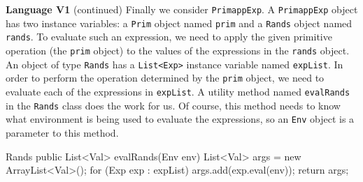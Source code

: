 \begin{minipage}[t]{\sw}
\slidenumber
\LARGE
{\bf Language V1} (continued)\exx
Finally we consider \verb'PrimappExp'.
A \verb'PrimappExp' object has two instance variables:
a \verb'Prim' object named \verb'prim'
and a \verb'Rands' object named \verb'rands'.
To evaluate such an expression,
we need to apply the given primitive operation
(the \verb'prim' object)
to the values of the expressions in the \verb'rands' object.\exx
An object of type \verb'Rands' has
a \verb'List<Exp>' instance variable named \verb'expList'.
In order to perform the operation determined by the \verb'prim' object,
we need to evaluate each of the expressions in \verb'expList'.
A utility method named \verb'evalRands' in the \verb'Rands' class
does the work for us.
Of course, this method needs to know what environment is being used
to evaluate the expressions,
so an \verb'Env' object is a parameter to this method.
\begin{qv}
Rands
    public List<Val> evalRands(Env env) {
        List<Val> args = new ArrayList<Val>();
        for (Exp exp : expList)
            args.add(exp.eval(env));
        return args;
    }
\end{qv}
\end{minipage}
